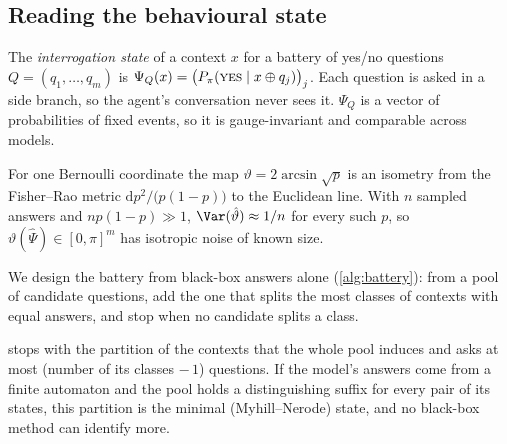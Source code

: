 \subsection{Reading the behavioural state}
The \emph{interrogation state} of a context $x$ for a battery of yes/no questions $Q=(q_1,\dots,q_m)$ is $\Psi_Q(x)=\big(P_\pi(\textsc{yes}\mid x\oplus q_j)\big)_{j}$. Each question is asked in a side branch, so the agent's conversation never sees it. $\Psi_Q$ is a vector of probabilities of fixed events, so it is gauge-invariant and comparable across models.
\begin{proposition}\label{prop:fisher}
For one Bernoulli coordinate the map $\vartheta=2\arcsin\sqrt{p}$ is an isometry from the Fisher--Rao metric $\mathrm{d}p^2/\big(p(1-p)\big)$ to the Euclidean line. With $n$ sampled answers and $np(1-p)\gg1$, $\Var(\hat\vartheta)\approx 1/n$ for every such $p$, so $\vartheta(\hat\Psi)\in[0,\pi]^m$ has isotropic noise of known size.
\end{proposition}
We design the battery from black-box answers alone (\cref{alg:battery}): from a pool of candidate questions, add the one that splits the most classes of contexts with equal answers, and stop when no candidate splits a class.
\begin{proposition}\label{prop:battery}
 stops with the partition of the contexts that the whole pool induces and asks at most (number of its classes $-\,1$) questions. If the model's answers come from a finite automaton and the pool holds a distinguishing suffix for every pair of its states, this partition is the minimal (Myhill--Nerode) state, and no black-box method can identify more.
\end{proposition}

